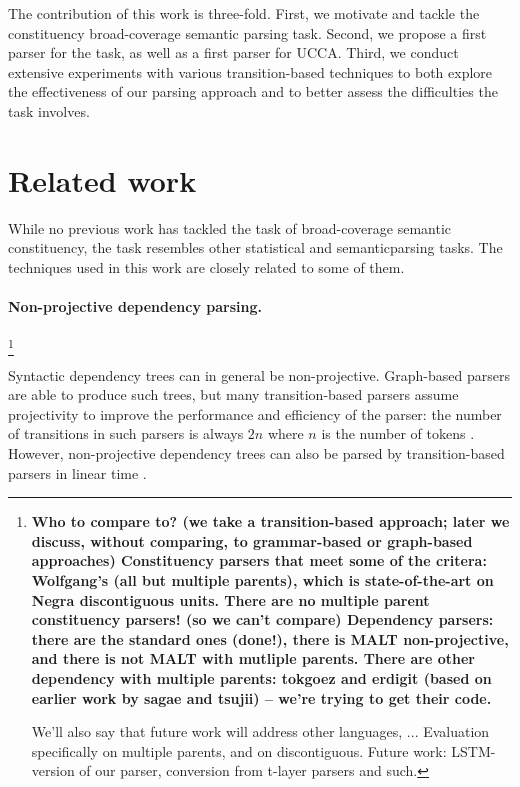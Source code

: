 \documentclass[11pt]{article}
\newcommand{\my}[1]{\footnote{\bf #1}}
\begin{document}
The contribution of this work is three-fold. First, we motivate and tackle the constituency broad-coverage
semantic parsing task. Second, we propose a first parser for the task, as well as a first parser for UCCA.
Third, we conduct extensive experiments with various transition-based techniques to both explore the
effectiveness of our parsing approach and to better assess the difficulties the task involves.


\section{Related work}

While no previous work has tackled the task of broad-coverage semantic constituency, 
the task resembles other statistical and semanticparsing tasks. The techniques used
in this work are closely related to some of them.

\paragraph{Non-projective dependency parsing.}
\my{Who to compare to? (we take a transition-based approach; later we discuss, without comparing, to grammar-based
  or graph-based approaches)
  Constituency parsers that meet some of the critera: Wolfgang's (all but multiple parents),
        which is state-of-the-art on Negra discontiguous units.
        There are no multiple parent constituency parsers! (so we can't compare)
  Dependency parsers: there are the standard ones (done!), there is MALT non-projective, and there is not MALT with mutliple parents. There are other dependency with multiple parents: tokgoez and erdigit (based on earlier work by sagae and tsujii) -- we're trying to get their code.
  
  We'll also say that future work will address other languages, ...
  Evaluation specifically on multiple parents, and on discontiguous.
  Future work: LSTM-version of our parser, conversion from t-layer parsers and such.
}

Syntactic dependency trees can in general be non-projective. Graph-based parsers are able to produce such trees, but many transition-based parsers assume projectivity to improve the performance and efficiency of the parser: the number of transitions in such parsers is always $2n$ where $n$ is the number of tokens \cite{nivre2004incrementality}. However, non-projective dependency trees can also be parsed by transition-based parsers in linear time \cite{nivre2009non}.
\end{document}
